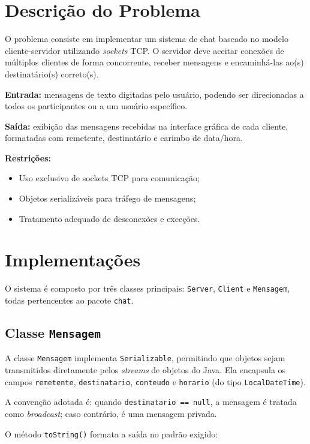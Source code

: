\documentclass[10pt,twocolumn,a4paper]{article}
\begin{document}
\section{Descrição do Problema}
O problema consiste em implementar um sistema de chat baseado no modelo
cliente-servidor utilizando \textit{sockets} TCP. O servidor deve aceitar
conexões de múltiplos clientes de forma concorrente, receber mensagens e
encaminhá-las ao(s) destinatário(s) correto(s).

\textbf{Entrada:} mensagens de texto digitadas pelo usuário, podendo ser
direcionadas a todos os participantes ou a um usuário específico.

\textbf{Saída:} exibição das mensagens recebidas na interface gráfica de cada
cliente, formatadas com remetente, destinatário e carimbo de data/hora.

\textbf{Restrições:}
\begin{itemize}
    \item Uso exclusivo de sockets TCP para comunicação;
    \item Objetos serializáveis para tráfego de mensagens;
    \item Tratamento adequado de desconexões e exceções.
\end{itemize}


\section{Implementações}
O sistema é composto por três classes principais: \texttt{Server},
\texttt{Client} e \texttt{Mensagem}, todas pertencentes ao pacote \texttt{chat}.

\subsection{Classe \texttt{Mensagem}}

A classe \texttt{Mensagem} implementa \texttt{Serializable}, permitindo que
objetos sejam transmitidos diretamente pelos \textit{streams} de objetos do
Java. Ela encapsula os campos \texttt{remetente}, \texttt{destinatario},
\texttt{conteudo} e \texttt{horario} (do tipo \texttt{LocalDateTime}).

A convenção adotada é: quando \texttt{destinatario == null}, a mensagem é
tratada como \textit{broadcast}; caso contrário, é uma mensagem privada.

O método \texttt{toString()} formata a saída no padrão exigido:
\end{document}
